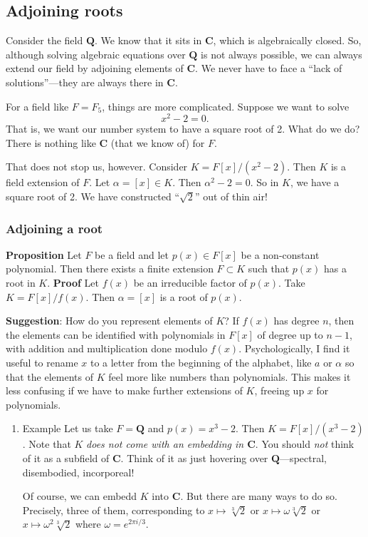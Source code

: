 \documentclass[11pt]{article}
\begin{document}
\subsection{Adjoining roots}
\label{sec:orgc4e0af9}
Consider the field \(\mathbf{Q}\).
We know that it sits in \(\mathbf{C}\), which is algebraically closed.
So, although solving algebraic equations over \(\mathbf{Q}\) is not always possible, we can always extend our field by adjoining elements of \(\mathbf{C}\).
We never have to face a ``lack of solutions''---they are always there in \(\mathbf{C}\).

For a field like \(F = F_{5}\), things are more complicated.
Suppose we want to solve
\[ x^{2} - 2 = 0.\]
That is, we want our number system to have a square root of 2.
What do we do?
There is nothing like \(\mathbf{C}\) (that we know of) for \(F\).

That does not stop us, however.
Consider \(K = F[x]/(x^2-2)\).
Then \(K\) is a field extension of \(F\).
Let \(\alpha = [x] \in K\).
Then \(\alpha^2 - 2 = 0.\)
So in \(K\), we have a square root of 2.
We have constructed ``\(\sqrt{2}\)'' out of thin air!
\subsubsection{Adjoining a root}
\label{sec:org61e17d0}
\textbf{\textbf{Proposition}}  Let \(F\) be a field and let \(p(x) \in F[x]\) be a non-constant polynomial.
Then there exists a finite extension \(F \subset K\) such that \(p(x)\) has a root in \(K\).
\textbf{\textbf{Proof}} Let \(f(x)\) be an irreducible factor of \(p(x)\).
Take \(K = F[x]/f(x)\).
Then \(\alpha = [x]\) is a root of \(p(x)\).

\textbf{\textbf{Suggestion}}: How do you represent elements of \(K\)?
If \(f(x)\) has degree \(n\), then the elements can be identified with polynomials in \(F[x]\) of degree up to \(n-1\), with addition and multiplication done modulo \(f(x)\).
Psychologically, I find it useful to rename \(x\) to a letter from the beginning of the alphabet, like \(a\) or \(\alpha\) so that the elements of \(K\) feel more like numbers than polynomials.
This makes it less confusing if we have to make further extensions of \(K\), freeing up \(x\) for polynomials.
\begin{enumerate}
\item Example
\label{sec:orgbea0e09}
Let us take \(F = \mathbf{Q}\) and \(p(x) = x^3-2\).
Then \(K = F[x]/(x^3-2)\).
Note that \(K\) \emph{does not come with an embedding in \(\mathbf{C}\)}.
You should \emph{not} think of it as a subfield of \(\mathbf{C}\).
Think of it as just hovering over \(\mathbf{Q}\)---spectral, disembodied, incorporeal!

Of course, we can embedd \(K\) into \(\mathbf{C}\).
But there are many ways to do so.
Precisely, three of them, corresponding to \(x \mapsto \sqrt[3]{2}\) or \(x \mapsto \omega\sqrt[3]{2}\) or \(x \mapsto \omega^{2}\sqrt[3]{2}\) where \(\omega = e^{2\pi i/3}\).
\end{enumerate}
\end{document}
